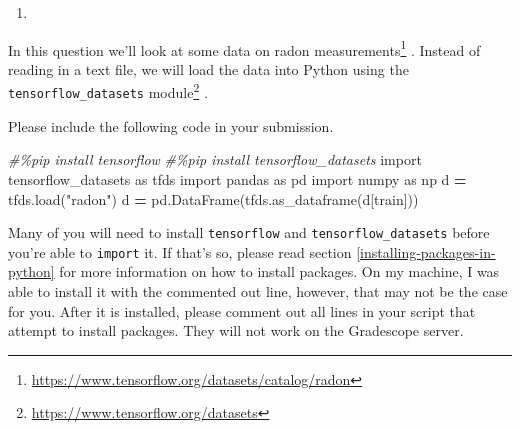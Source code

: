 \documentclass[
  12pt,
  krantz2]{krantz}
\makeatletter
\newenvironment{Shaded}{\begin{snugshade}}{\end{snugshade}}
\newcommand{\CommentTok}[1]{\textcolor[rgb]{0.37,0.37,0.37}{\textit{#1}}}
\newcommand{\ImportTok}[1]{#1}
\newcommand{\NormalTok}[1]{#1}
\newcommand{\OperatorTok}[1]{\textcolor[rgb]{0.43,0.43,0.43}{\textbf{#1}}}
\newcommand{\StringTok}[1]{\textcolor[rgb]{0.5,0.5,0.5}{#1}}
\providecommand{\tightlist}{%
  \setlength{\itemsep}{0pt}\setlength{\parskip}{0pt}}
\renewcommand{\href}[2]{#2\footnote{\url{#1}}}
\newenvironment{kframe}{%
\medskip{}
\setlength{\fboxsep}{.8em}
 \def\at@end@of@kframe{}%
 \ifinner\ifhmode%
  \def\at@end@of@kframe{\end{minipage}}%
  \begin{minipage}{\columnwidth}%
 \fi\fi%
 \def\FrameCommand##1{\hskip\@totalleftmargin \hskip-\fboxsep
 \colorbox{shadecolor}{##1}\hskip-\fboxsep
     \hskip-\linewidth \hskip-\@totalleftmargin \hskip\columnwidth}%
 \MakeFramed {\advance\hsize-\width
   \@totalleftmargin\z@ \linewidth\hsize
   \@setminipage}}%
 {\par\unskip\endMakeFramed%
 \at@end@of@kframe}
\renewenvironment{Shaded}{\begin{kframe}}{\end{kframe}}
\makeatother
\begin{document}
\begin{enumerate}
\def\labelenumi{\arabic{enumi}.}
\setcounter{enumi}{1}
\tightlist
\item
\end{enumerate}

In this question we'll look at \href{https://www.tensorflow.org/datasets/catalog/radon}{some data on radon measurements} \citep{GelmanHill:2007}. Instead of reading in a text file, we will load the data into Python using the \href{https://www.tensorflow.org/datasets}{\texttt{tensorflow\_datasets} module} \citep{TFDS}.

Please include the following code in your submission.

\begin{Shaded}
\begin{Highlighting}[]
\CommentTok{\#\%pip install tensorflow}
\CommentTok{\#\%pip install tensorflow\_datasets}
\ImportTok{import}\NormalTok{ tensorflow\_datasets }\ImportTok{as}\NormalTok{ tfds}
\ImportTok{import}\NormalTok{ pandas }\ImportTok{as}\NormalTok{ pd}
\ImportTok{import}\NormalTok{ numpy }\ImportTok{as}\NormalTok{ np}
\NormalTok{d }\OperatorTok{=}\NormalTok{ tfds.load(}\StringTok{"radon"}\NormalTok{)}
\NormalTok{d }\OperatorTok{=}\NormalTok{ pd.DataFrame(tfds.as\_dataframe(d[}\StringTok{\textquotesingle{}train\textquotesingle{}}\NormalTok{]))}
\end{Highlighting}
\end{Shaded}

Many of you will need to install \texttt{tensorflow} and \texttt{tensorflow\_datasets} before you're able to \texttt{import} it. If that's so, please read section \ref{installing-packages-in-python} for more information on how to install packages. On my machine, I was able to install it with the commented out line, however, that may not be the case for you. After it is installed, please comment out all lines in your script that attempt to install packages. They will not work on the Gradescope server.
\end{document}
